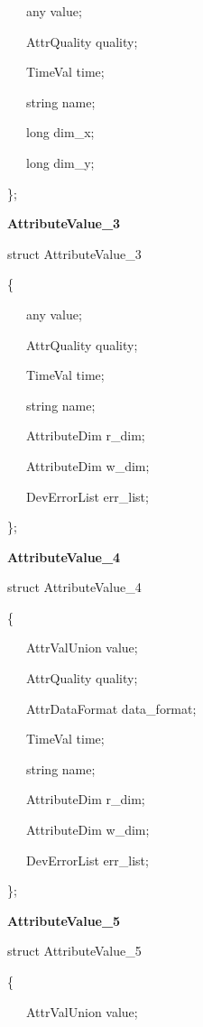 ~~~any value;

~~~AttrQuality quality;

~~~TimeVal time;

~~~string name;

~~~long dim\_x;

~~~long dim\_y;

\};\\


\begin{flushleft}
\textbf{AttributeValue\_3}
\par\end{flushleft}

struct AttributeValue\_3

\{

~~~any value;

~~~AttrQuality quality;

~~~TimeVal time;

~~~string name;

~~~AttributeDim r\_dim;

~~~AttributeDim w\_dim;

~~~DevErrorList err\_list;

\};\\


\begin{flushleft}
\textbf{AttributeValue\_4}
\par\end{flushleft}

struct AttributeValue\_4

\{

~~~AttrValUnion value;

~~~AttrQuality quality;

~~~AttrDataFormat data\_format;

~~~TimeVal time;

~~~string name;

~~~AttributeDim r\_dim;

~~~AttributeDim w\_dim;

~~~DevErrorList err\_list;

\};\\


\begin{flushleft}
\textbf{AttributeValue\_5}
\par\end{flushleft}

struct AttributeValue\_5

\{

~~~AttrValUnion value;

